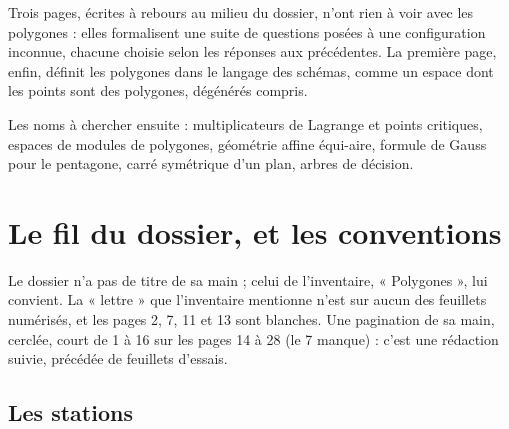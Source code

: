 \documentclass[11pt,a4paper]{article}
\begin{document}
\begin{resume}
Trois pages, écrites à rebours au milieu du dossier, n'ont rien à voir avec les
polygones : elles formalisent une suite de questions posées à une configuration
inconnue, chacune choisie selon les réponses aux précédentes. La première page,
enfin, définit les polygones dans le langage des schémas, comme un espace dont
les points sont des polygones, dégénérés compris.

Les noms à chercher ensuite : multiplicateurs de Lagrange et points critiques,
espaces de modules de polygones, géométrie affine équi-aire, formule de Gauss
pour le pentagone, carré symétrique d'un plan, arbres de décision.

\end{resume}

\section*{Le fil du dossier, et les conventions}

Le dossier n'a pas de titre de sa main ; celui de l'inventaire, « Polygones »,
lui convient. La « lettre » que l'inventaire mentionne n'est sur aucun des
feuillets numérisés, et les pages 2, 7, 11 et 13 sont blanches. Une
pagination de sa main, cerclée, court de 1 à 16 sur les pages 14 à 28 (le 7
manque) : c'est une rédaction suivie, précédée de feuillets d'essais.

\subsection*{Les stations}
\end{document}
